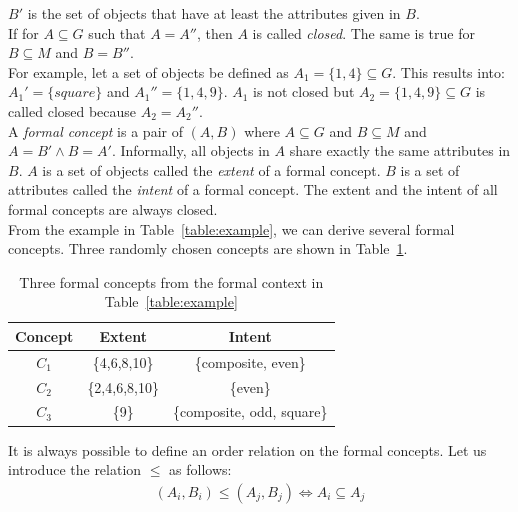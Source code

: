\documentclass[11pt]{report}
\begin{document}
$B'$ is the set of objects that have at least the attributes given in $B$. \\

If for $A \subseteq G$ such that $A = A''$, then $A$ is called \textit{closed}. The same is true for $B \subseteq M$ and $B = B''$. \\

For example, let a set of objects be defined as $A_1 = \{1,4\} \subseteq G$. This results into: $A_1' = \{square\}$ and $A_1'' = \{1,4,9\}$. $A_1$ is not closed but $A_2 = \{1,4,9\} \subseteq G$ is called closed because $A_2 = A_2''$. \\   

A \textit{formal concept} is a pair of $(A, B)$ where $A \subseteq G$ and $B \subseteq M$ and $A = B' \wedge B = A' $. Informally, all objects in $A$ share exactly the same attributes in $B$. $A$ is a set of objects called the \textit{extent} of a formal concept. $B$ is a set of attributes called the \textit{intent} of a formal concept. The extent and the intent of all formal concepts are always closed.\\

From the example in Table~\ref{table:example}, we can derive several formal concepts. Three randomly chosen concepts are shown in Table~\ref{table:exampleConcepts}. \\

\begin{table}[h]
\caption{Three formal concepts from the formal context in Table~\ref{table:example}}
\label{table:exampleConcepts}
\centering

\def\arraystretch{1.2}%
\begin{tabular}{ c c c }
\hline
 Concept & Extent & Intent \\
\hline

$C_1$ & \{4,6,8,10\} & \{composite, even\} \\
$C_2$ & \{2,4,6,8,10\} & \{even\} \\
$C_3$ & \{9\} & \{composite, odd, square\} \\

\hline
\end{tabular}
\end{table}

It is always possible to define an order relation on the formal concepts. Let us introduce the relation $\le$ as follows:
\begin{align*} (A_i,B_i) \le (A_j, B_j) \Longleftrightarrow	A_i \subseteq A_j
\end{align*}
\end{document}
